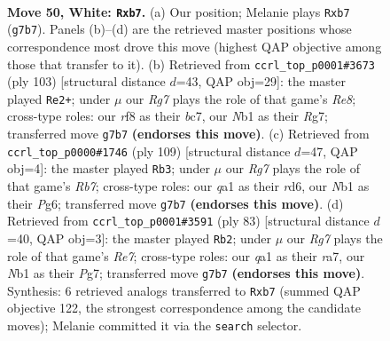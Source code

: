 \documentclass[11pt]{article}
\begin{document}
\clearpage

\begin{figure}[p]\centering
\begin{subfigure}{0.46\textwidth}\centering
\resizebox{\linewidth}{!}{%
\newchessgame
\chessboard[
  setfen={3k1r2/pb4Rp/8/4nP2/1p1p4/8/4P3/qNK5 w - - 0 50},
  showmover=false,
  pgfstyle=straightmove, color=movearrow, markmove={g7-b7}
]}
\caption{}
\end{subfigure}\hfill
\begin{subfigure}{0.46\textwidth}\centering
\resizebox{\linewidth}{!}{%
\newchessgame
\chessboard[
  setfen={7k/1pB3r1/4P2p/3p1p2/3Q4/P6P/1P5K/4r3 b - - 2 52},
  showmover=false,
  pgfstyle=straightmove, color=movearrow, markmove={e1-e2}
]}
\caption{}
\end{subfigure}
\\[4pt]
\begin{subfigure}{0.46\textwidth}\centering
\resizebox{\linewidth}{!}{%
\newchessgame
\chessboard[
  setfen={8/5k2/1P1R2p1/2p5/p3P1p1/P5P1/1r6/5K2 b - - 1 55},
  showmover=false,
  pgfstyle=straightmove, color=movearrow, markmove={b2-b3}
]}
\caption{}
\end{subfigure}\hfill
\begin{subfigure}{0.46\textwidth}\centering
\resizebox{\linewidth}{!}{%
\newchessgame
\chessboard[
  setfen={8/R5pk/1p6/1P2np1p/7P/6PN/P3r3/5K2 b - - 2 42},
  showmover=false,
  pgfstyle=straightmove, color=movearrow, markmove={e2-b2}
]}
\caption{}
\end{subfigure}
\caption{\textbf{Move 50, White: \texttt{Rxb7}.} (a) Our position; Melanie plays \texttt{Rxb7} (\texttt{g7b7}). Panels (b)--(d) are the retrieved master positions whose correspondence most drove this move (highest QAP objective among those that transfer to it). (b) Retrieved from \texttt{ccrl\_top\_p0001\#3673} (ply 103) [structural distance $d$=43, QAP obj=29]: the master played \texttt{Re2+}; under $\mu$ our \emph{Rg7} plays the role of that game's \emph{Re8}; cross-type roles: our \emph{r}f8 as their \emph{b}c7, our \emph{N}b1 as their \emph{R}g7; transferred move \texttt{g7b7} \textbf{(endorses this move)}. (c) Retrieved from \texttt{ccrl\_top\_p0000\#1746} (ply 109) [structural distance $d$=47, QAP obj=4]: the master played \texttt{Rb3}; under $\mu$ our \emph{Rg7} plays the role of that game's \emph{Rb7}; cross-type roles: our \emph{q}a1 as their \emph{r}d6, our \emph{N}b1 as their \emph{P}g6; transferred move \texttt{g7b7} \textbf{(endorses this move)}. (d) Retrieved from \texttt{ccrl\_top\_p0001\#3591} (ply 83) [structural distance $d$=40, QAP obj=3]: the master played \texttt{Rb2}; under $\mu$ our \emph{Rg7} plays the role of that game's \emph{Re7}; cross-type roles: our \emph{q}a1 as their \emph{r}a7, our \emph{N}b1 as their \emph{P}g7; transferred move \texttt{g7b7} \textbf{(endorses this move)}. Synthesis: 6 retrieved analogs transferred to \texttt{Rxb7} (summed QAP objective 122, the strongest correspondence among the candidate moves); Melanie committed it via the \texttt{search} selector.}
\label{fig:thought-m98}
\end{figure}
\end{document}
